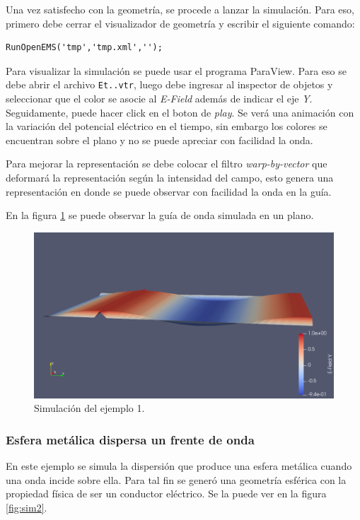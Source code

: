 \documentclass[
    11pt,
    spanish,
	a4paper
]{article}
\begin{document}
Una vez satisfecho con la geometría, se procede a lanzar la simulación. Para
eso, primero debe cerrar el visualizador de geometría y escribir el siguiente
comando:

\begin{verbatim}
RunOpenEMS('tmp','tmp.xml','');
\end{verbatim}

Para visualizar la simulación se puede usar el programa ParaView. Para eso se
debe abrir el archivo \texttt{Et..vtr}, luego debe ingresar al inspector de
objetos y seleccionar que el color se asocie al \emph{E-Field} además de indicar
el eje \emph{Y}. Seguidamente,
puede hacer click en el boton de \emph{play}.
Se verá una animación con la variación del potencial eléctrico en el tiempo, sin
embargo los colores se encuentran sobre el plano y no se puede apreciar con
facilidad la onda.

Para mejorar la representación se debe colocar el filtro \emph{warp-by-vector}
que deformará la representación según la intensidad del campo, esto genera una
representación en donde se puede observar con facilidad la onda en la guía.

En la figura \ref{fig:sim1} se puede observar la guía de onda simulada en un plano.

\begin{figure}[htbp]
	\centering
	\includegraphics[width=\textwidth]{./img/sim1.png}
	\caption{Simulación del ejemplo 1.}
	\label{fig:sim1}
\end{figure}

\subsubsection{Esfera metálica dispersa un frente de onda}
\label{subsub:oejemplo2}

En este ejemplo se simula la dispersión que produce una esfera metálica cuando
una onda incide sobre ella.
Para tal fin se generó una geometría esférica con la propiedad física de ser un
conductor eléctrico. Se la puede ver en la figura \ref{fig:sim2}.
\end{document}
